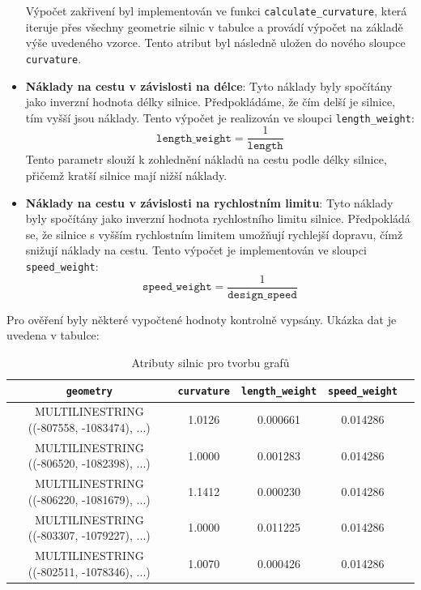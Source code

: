 \begin{itemize}
    Výpočet zakřivení byl implementován ve funkci \texttt{calculate\_curvature}, která iteruje přes všechny geometrie silnic v tabulce a provádí výpočet na základě výše uvedeného vzorce. Tento atribut byl následně uložen do nového sloupce \texttt{curvature}.
    
    \item \textbf{Náklady na cestu v závislosti na délce}: Tyto náklady byly spočítány jako inverzní hodnota délky silnice. Předpokládáme, že čím delší je silnice, tím vyšší jsou náklady. Tento výpočet je realizován ve sloupci \texttt{length\_weight}:
    \[
    \texttt{length\_weight} = \frac{1}{\texttt{length}}
    \]
    Tento parametr slouží k zohlednění nákladů na cestu podle délky silnice, přičemž kratší silnice mají nižší náklady.
    
    \item \textbf{Náklady na cestu v závislosti na rychlostním limitu}: Tyto náklady byly spočítány jako inverzní hodnota rychlostního limitu silnice. Předpokládá se, že silnice s vyšším rychlostním limitem umožňují rychlejší dopravu, čímž snižují náklady na cestu. Tento výpočet je implementován ve sloupci \texttt{speed\_weight}:
    \[
    \texttt{speed\_weight} = \frac{1}{\texttt{design\_speed}}
    \]
\end{itemize}

Pro ověření byly některé vypočtené hodnoty kontrolně vypsány. Ukázka dat je uvedena v tabulce:

\begin{table}[H]
    \centering
    \caption{Atributy silnic pro tvorbu grafů}
    \begin{tabular}{|c|c|c|c|c|}
    \hline
    \texttt{geometry} & \texttt{curvature} & \texttt{length\_weight} & \texttt{speed\_weight} \\
    \hline
    MULTILINESTRING ((-807558, -1083474), ...) & 1.0126 & 0.000661 & 0.014286 \\
    MULTILINESTRING ((-806520, -1082398), ...) & 1.0000 & 0.001283 & 0.014286 \\
    MULTILINESTRING ((-806220, -1081679), ...) & 1.1412 & 0.000230 & 0.014286 \\
    MULTILINESTRING ((-803307, -1079227), ...) & 1.0000 & 0.011225 & 0.014286 \\
    MULTILINESTRING ((-802511, -1078346), ...) & 1.0070 & 0.000426 & 0.014286 \\
    \hline
    \end{tabular}
\end{table}

